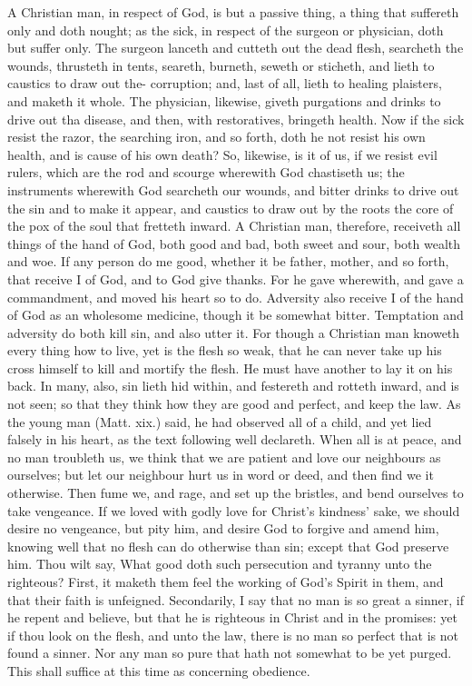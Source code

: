 A Christian man, in respect of God, is but a passive thing,
a thing that suffereth only and doth nought; as the sick, 
in respect of the surgeon or physician, doth but suffer 
only. The surgeon lanceth and cutteth out the dead flesh, 
searcheth the wounds, thrusteth in tents, seareth, burneth, 
seweth or sticheth, and lieth to caustics to draw out the- 
corruption; and, last of all, lieth to healing plaisters, and 
maketh it whole. The physician, likewise, giveth purgations
and drinks to drive out tha disease, and then, with 
restoratives, bringeth health. Now if the sick resist the 
razor, the searching iron, and so forth, doth he not resist 
his own health, and is cause of his own death? So, likewise,
is it of us, if we resist evil rulers, which are the rod
and scourge wherewith God chastiseth us; the instruments 
wherewith God searcheth our wounds, and bitter drinks 
to drive out the sin and to make it appear, and caustics to 
draw out by the roots the core of the pox of the soul that 
fretteth inward. A Christian man, therefore, receiveth all 
things of the hand of God, both good and bad, both sweet 
and sour, both wealth and woe. If any person do me good, 
whether it be father, mother, and so forth, that receive I of 
God, and to God give thanks. For he gave wherewith, and 
gave a commandment, and moved his heart so to do. Adversity
also receive I of the hand of God as an wholesome 
medicine, though it be somewhat bitter. Temptation and 
adversity do both kill sin, and also utter it. For though a 
Christian man knoweth every thing how to live, yet is the 
flesh so weak, that he can never take up his cross himself 
to kill and mortify the flesh. He must have another to 
lay it on his back. In many, also, sin lieth hid within, 
and festereth and rotteth inward, and is not seen; so that 
they think how they are good and perfect, and keep the 
law. As the young man (Matt. xix.) said, he had observed
all of a child, and yet lied falsely in his heart, as 
the text following well declareth. When all is at peace, 
and no man troubleth us, we think that we are patient and 
love our neighbours as ourselves; but let our neighbour 
hurt us in word or deed, and then find we it otherwise.
Then fume we, and rage, and set up the bristles, and bend 
ourselves to take vengeance. If we loved with godly love 
for Christ's kindness' sake, we should desire no vengeance, 
but pity him, and desire God to forgive and amend him, 
knowing well that no flesh can do otherwise than sin;
except that God preserve him. Thou wilt say, What 
good doth such persecution and tyranny unto the righteous?
First, it maketh them feel the working of God's 
Spirit in them, and that their faith is unfeigned. Secondarily,
I say that no man is so great a sinner, if he repent 
and believe, but that he is righteous in Christ and in the 
promises: yet if thou look on the flesh, and unto the law, 
there is no man so perfect that is not found a sinner. Nor 
any man so pure that hath not somewhat to be yet purged.
This shall suffice at this time as concerning obedience. 

